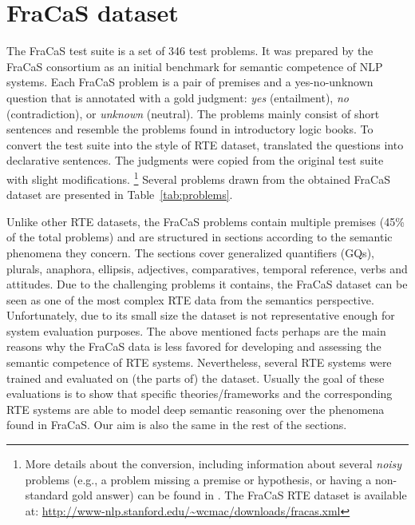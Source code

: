 \documentclass[11pt]{article}
\newcommand{\addlater}[1]{\todo[line,size=\tiny]{#1}}
\begin{document}
\section{FraCaS dataset}
\label{sec:fracas}

The FraCaS test suite \cite{fracas} is a set of 346 test problems.
It was prepared by the FraCaS consortium as an initial benchmark for semantic competence of NLP systems. 
Each FraCaS problem is a pair of premises and a yes-no-unknown question that is annotated with a gold judgment:  {\em yes} (entailment), {\em no} (contradiction), or {\em unknown} (neutral). 
The problems mainly consist of short sentences and resemble the problems found in introductory logic books. 
To convert the test suite into the style of RTE dataset,  translated the questions into declarative sentences.
The judgments were copied from the original test suite with slight modifications.%
%
\footnote{\label{fn:8.7}More details about the conversion, including information about several {\em noisy} problems (e.g., a problem missing a premise or hypothesis, or having a non-standard gold answer) can be found in .
The FraCaS RTE dataset is available at: \url{http://www-nlp.stanford.edu/~wcmac/downloads/fracas.xml}
}
Several problems drawn from the obtained FraCaS dataset are presented in Table~\ref{tab:problems}.


Unlike other RTE datasets, the FraCaS problems contain multiple premises (45\% of the total problems) and are structured in sections  according to the semantic phenomena they concern. %
The sections cover generalized quantifiers (GQs), plurals, anaphora, ellipsis, adjectives, comparatives, temporal reference, verbs and attitudes.
Due to the challenging problems it contains, the FraCaS dataset can be seen as one of the most complex RTE data from the semantics perspective.
Unfortunately, due to its small size 
the dataset is not representative enough for system evaluation purposes.   
The above mentioned facts perhaps are the main reasons why the FraCaS data is less favored for developing and assessing the semantic competence of RTE systems.
Nevertheless, several RTE systems \cite{MacCartney:08,naturalli,lewis-steedman:13,tian-miyao-matsuzaki:2014:P14-1,mineshima-EtAl:2015:EMNLP} were trained and evaluated on (the parts of) the dataset.
Usually the goal of these evaluations is to show that specific theories/frameworks and the corresponding RTE systems are able to model deep semantic reasoning over the phenomena found in FraCaS.  
Our aim is also the same in the rest of the sections.
\end{document}
